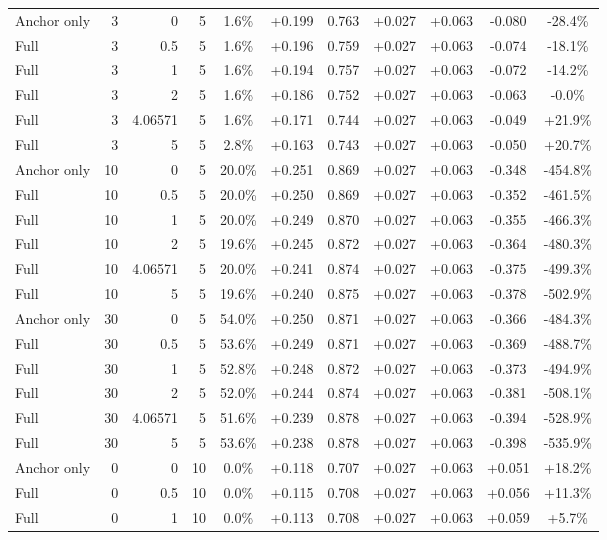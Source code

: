 \begin{table}[htbp]
\begin{tabular}{lrrrccccccc}
Anchor only & 3 & 0 & 5 & 1.6\% & +0.199 & 0.763 & +0.027 & +0.063 & -0.080 & -28.4\% \\
Full & 3 & 0.5 & 5 & 1.6\% & +0.196 & 0.759 & +0.027 & +0.063 & -0.074 & -18.1\% \\
Full & 3 & 1 & 5 & 1.6\% & +0.194 & 0.757 & +0.027 & +0.063 & -0.072 & -14.2\% \\
Full & 3 & 2 & 5 & 1.6\% & +0.186 & 0.752 & +0.027 & +0.063 & -0.063 & -0.0\% \\
Full & 3 & 4.06571 & 5 & 1.6\% & +0.171 & 0.744 & +0.027 & +0.063 & -0.049 & +21.9\% \\
Full & 3 & 5 & 5 & 2.8\% & +0.163 & 0.743 & +0.027 & +0.063 & -0.050 & +20.7\% \\
Anchor only & 10 & 0 & 5 & 20.0\% & +0.251 & 0.869 & +0.027 & +0.063 & -0.348 & -454.8\% \\
Full & 10 & 0.5 & 5 & 20.0\% & +0.250 & 0.869 & +0.027 & +0.063 & -0.352 & -461.5\% \\
Full & 10 & 1 & 5 & 20.0\% & +0.249 & 0.870 & +0.027 & +0.063 & -0.355 & -466.3\% \\
Full & 10 & 2 & 5 & 19.6\% & +0.245 & 0.872 & +0.027 & +0.063 & -0.364 & -480.3\% \\
Full & 10 & 4.06571 & 5 & 20.0\% & +0.241 & 0.874 & +0.027 & +0.063 & -0.375 & -499.3\% \\
Full & 10 & 5 & 5 & 19.6\% & +0.240 & 0.875 & +0.027 & +0.063 & -0.378 & -502.9\% \\
Anchor only & 30 & 0 & 5 & 54.0\% & +0.250 & 0.871 & +0.027 & +0.063 & -0.366 & -484.3\% \\
Full & 30 & 0.5 & 5 & 53.6\% & +0.249 & 0.871 & +0.027 & +0.063 & -0.369 & -488.7\% \\
Full & 30 & 1 & 5 & 52.8\% & +0.248 & 0.872 & +0.027 & +0.063 & -0.373 & -494.9\% \\
Full & 30 & 2 & 5 & 52.0\% & +0.244 & 0.874 & +0.027 & +0.063 & -0.381 & -508.1\% \\
Full & 30 & 4.06571 & 5 & 51.6\% & +0.239 & 0.878 & +0.027 & +0.063 & -0.394 & -528.9\% \\
Full & 30 & 5 & 5 & 53.6\% & +0.238 & 0.878 & +0.027 & +0.063 & -0.398 & -535.9\% \\
Anchor only & 0 & 0 & 10 & 0.0\% & +0.118 & 0.707 & +0.027 & +0.063 & +0.051 & +18.2\% \\
Full & 0 & 0.5 & 10 & 0.0\% & +0.115 & 0.708 & +0.027 & +0.063 & +0.056 & +11.3\% \\
Full & 0 & 1 & 10 & 0.0\% & +0.113 & 0.708 & +0.027 & +0.063 & +0.059 & +5.7\% \\

\end{tabular}
\end{table}
